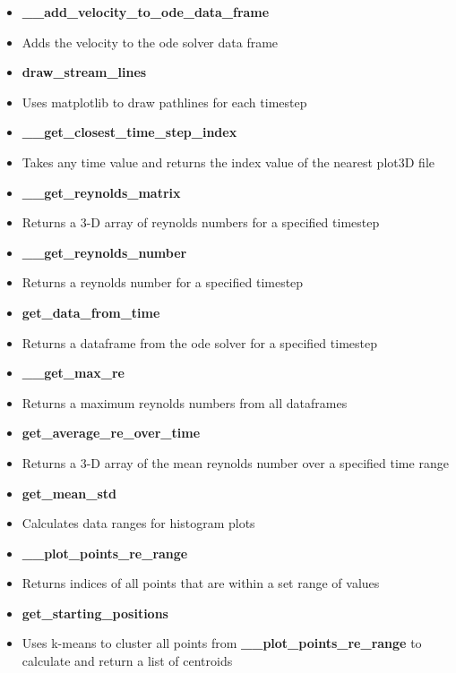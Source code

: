 \begin{itemize}
    \item \textbf{\_\_add\_velocity\_to\_ode\_data\_frame}
    \item[] Adds the velocity to the ode solver data frame
    
    \item \textbf{draw\_stream\_lines}
    \item[] Uses matplotlib to draw pathlines for each timestep
    
    
    \item \textbf{\_\_get\_closest\_time\_step\_index}
    \item[] Takes any time value and returns the index value of the nearest plot3D file
    
    \item \textbf{\_\_get\_reynolds\_matrix}
    \item[] Returns a 3-D array of reynolds numbers for a specified timestep

    \item \textbf{\_\_get\_reynolds\_number}
    \item[] Returns a reynolds number for a specified timestep

    \item \textbf{get\_data\_from\_time}
    \item[] Returns a dataframe from the ode solver for a specified timestep 

    \item \textbf{\_\_get\_max\_re}
    \item[] Returns a maximum reynolds numbers from all dataframes

    \item \textbf{get\_average\_re\_over\_time}
    \item[] Returns a 3-D array of the mean reynolds number over a specified time range
    
    \item \textbf{get\_mean\_std}
    \item[] Calculates data ranges for histogram plots
    
    \item \textbf{\_\_plot\_points\_re\_range}
    \item[] Returns indices of all points that are within a set range of values
    
    \item \textbf{get\_starting\_positions}
    \item[] Uses k-means to cluster all points from \textbf{\_\_plot\_points\_re\_range} to calculate and return a list of centroids
    

\end{itemize}
